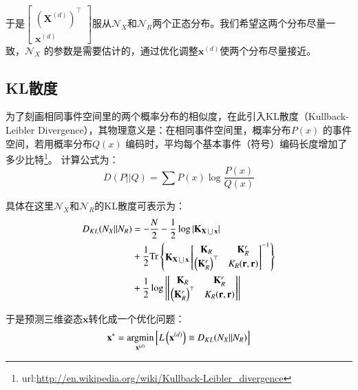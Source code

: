 于是$\begin{bmatrix} {\left(\mathbf{X}^{(d)}\right)}^\top \\ \mathbf{x}^{(d)} \end{bmatrix}$服从$\mathcal{N}_X$和$\mathcal{N}_R$两个正态分布。我们希望这两个分布尽量一致，$\mathcal{N}_X$ 的参数是需要估计的，通过优化调整$\mathbf{x}^{(d)}$使两个分布尽量接近。

\subsection{KL散度}
为了刻画相同事件空间里的两个概率分布的相似度，在此引入KL散度（Kullback-Leibler Divergence），其物理意义是：在相同事件空间里，概率分布$P(x)$ 的事件空间，若用概率分布$Q(x)$ 编码时，平均每个基本事件（符号）编码长度增加了多少比特\footnote{url:\url{http://en.wikipedia.org/wiki/Kullback-Leibler_divergence}}。 计算公式为：
\begin{equation}
  D(P||Q)=\sum P(x)\log \frac{P(x)}{Q(x)}
\end{equation}

具体在这里$\mathcal{N}_X$和$\mathcal{N}_R$的KL散度可表示为：
\begin{align}
 D_{KL}(N_X||N_R) &= -\frac{N}{2}-\frac{1}{2}\log|\mathbf{K}_{\mathbf{X}\bigcup \mathbf{x}}| \notag\\
                  &+ \frac{1}{2}\textmd{Tr} \begin{Bmatrix} \mathbf{K}_{\mathbf{X}\bigcup \mathbf{x}} \begin{bmatrix} \mathbf{K}_R & \mathbf{K}_R^r \notag\\ {\left(\mathbf{K}_R^r\right)}^\top & K_R(\mathbf{r},\mathbf{r}) \end{bmatrix} ^{-1} \end{Bmatrix}\\
                  &+ \frac{1}{2}\log \begin{vmatrix}\begin{bmatrix} \mathbf{K}_R & \mathbf{K}_R^r \\ {\left(\mathbf{K}_R^r\right)}^\top & K_R(\mathbf{r},\mathbf{r}) \end{bmatrix}\end{vmatrix}\label{eqn:KLorg}
\end{align}

于是预测三维姿态$\mathbf{x}$转化成一个优化问题：
\begin{equation}
  \mathbf{x}^\ast  = \underset{\mathbf{x}^{(d)}}{\textmd{argmin}} \left[L\left(\mathbf{x}^{(d)}\right)\equiv D_{KL}(N_X||N_R)\right]
\end{equation}


